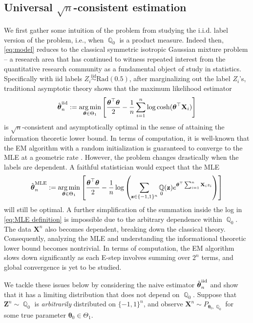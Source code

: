 \documentclass[preprint,reqno]{imsart}
\newcommand{\ttheta}{\boldsymbol{\theta}}
\DeclareMathOperator{\QQ}{\mathbb{Q}}
\newcommand{\Z}{\mathbf{Z}}
\newcommand{\X}{\mathbf{X}}
\DeclareMathOperator{\sumin}{\sum_{\mathnormal i=1}^{\mathnormal n}}
\newcommand{\thetaiid}{\hat{\boldsymbol \theta}^{\text{iid}}_{\mathnormal n}}
\DeclareMathOperator*{\argmin}{arg\,min}
\begin{document}
\subsection{Universal $\sqrt{n}$-consistent estimation}\label{sec:iid estimator}
We first gather some intuition of the problem from studying the i.i.d. label version of the problem, i.e., when $\QQ_0$ is a product measure. %
Indeed then, \eqref{eq:model} reduces to the classical symmetric isotropic Gaussian mixture problem -- a research area that has continued to witness repeated interest from the quantitative research community as a fundamental object of study in statistics. Specifically with iid labels $Z_i \overset{\text{iid}}{\sim} \text{Rad}(0.5)$, after marginalizing out the label $Z_i$'s, traditional asymptotic theory shows that the maximum likelihood estimator 
\begin{equation}\label{eq:iid estimator definition}
    \thetaiid := \argmin_{\ttheta \in \Theta_1} \left[\frac{\ttheta^\top \ttheta}{2} - \frac{1}{n} \sumin \log \cosh(\ttheta^\top \X_i) \right]
\end{equation}
is $\sqrt{n}$-consistent and asymptotically optimal in the sense of attaining the information theoretic lower bound. In terms of computation, %
it is well-known that the EM algorithm with a random initialization is guaranteed to converge to the MLE at a geometric rate \citep{xu2016global, daskalakis2017ten, klusowski2016statistical}.
%
However, the problem changes drastically when the labels are dependent. A faithful statistician would expect that the MLE 
%
\begin{equation}\label{eq:MLE definition}
    \hat{\ttheta}_n^{\text{MLE}} := \argmin_{\ttheta \in \Theta_1} \left[\frac{\ttheta^\top \ttheta}{2} - \frac{1}{n} \log \left( \sum_{\mathbf{z} \in \{-1,1\}^n} \QQ_0(\mathbf{z}) e^{\ttheta^\top \sumin \X_i z_i}\right) \right]
\end{equation}
will still be optimal. A further simplification of the summation inside the log in \eqref{eq:MLE definition} is impossible due to the arbitrary dependence within $\QQ_0$. The data $\X^n$ also becomes dependent, breaking down the classical theory. Consequently, analyzing the MLE and understanding the informational theoretic lower bound becomes nontrivial. In terms of computation, the EM algorithm slows down significantly as each E-step involves summing over $2^n$ terms, and global convergence is yet to be studied. 

We tackle these issues below by considering the naive estimator $\thetaiid$ and show that it has a limiting distribution that does not depend on $\QQ_0$.  Suppose that $\Z^n \sim \QQ_0$ is \emph{arbitrarily} distributed on $\{-1, 1\}^n$, and observe $\X^n \sim P_{\ttheta_0, \QQ_0}$ for some true parameter $\ttheta_0 \in \Theta_1$. %
\end{document}
